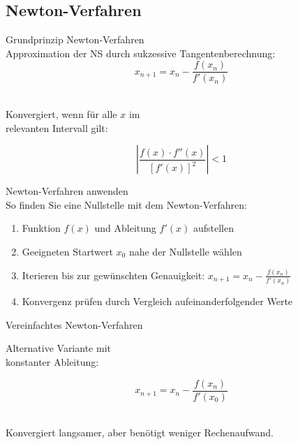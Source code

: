 \subsection{Newton-Verfahren}

\begin{concept}{Grundprinzip Newton-Verfahren}\\
Approximation der NS durch sukzessive Tangentenberechnung:
$$x_{n+1} = x_n - \frac{f(x_n)}{f'(x_n)}$$
\vspace{-4mm}\\
\begin{minipage}[t]{0.6\textwidth}
    Konvergiert, wenn für alle $x$ im \\ relevanten Intervall gilt:
\end{minipage}
\begin{minipage}{0.3\textwidth}
    $$\left|\frac{f(x) \cdot f''(x)}{[f'(x)]^2}\right| < 1$$
\end{minipage}
\end{concept}

\begin{KR}{Newton-Verfahren anwenden}\\
So finden Sie eine Nullstelle mit dem Newton-Verfahren:
\begin{enumerate}
    \item Funktion $f(x)$ und Ableitung $f'(x)$ aufstellen
    \item Geeigneten Startwert $x_0$ nahe der Nullstelle wählen
    \item Iterieren bis zur gewünschten Genauigkeit:
    $x_{n+1} = x_n - \frac{f(x_n)}{f'(x_n)}$
    \item Konvergenz prüfen durch Vergleich aufeinanderfolgender Werte
\end{enumerate}
\end{KR}

\begin{theorem}{Vereinfachtes Newton-Verfahren}\\
    \begin{minipage}{0.5\textwidth}
        Alternative Variante mit \\ konstanter Ableitung:
    \end{minipage}
    \begin{minipage}{0.25\textwidth}
        \vspace{-3mm}
        $$x_{n+1} = x_n - \frac{f(x_n)}{f'(x_0)}$$
    \end{minipage}
    \vspace{1mm}\\
    Konvergiert langsamer, aber benötigt weniger Rechenaufwand.
\end{theorem}

